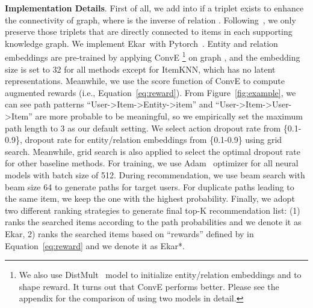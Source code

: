 \documentclass{article}
\newcommand{\name}{Ekar}
\newcommand{\xhdr}[1]{{\noindent\bfseries #1}.}
\begin{document}
\xhdr{Implementation Details} First of all, we add  into  if a triplet  exists to enhance the connectivity of graph, where  is the inverse of relation .
Following~\cite{Cao_2019}, we only preserve those triplets that are directly connected to items in each supporting knowledge graph.
We implement \name\ with Pytorch~\cite{paszke2017automatic}. 
Entity and relation embeddings are pre-trained by applying ConvE
\footnote{We also use DistMult~\cite{yang2014embedding} model to initialize entity/relation embeddings and to shape reward. It turns out that ConvE performs better. Please see the appendix for the comparison of using two models in detail.}
on graph ,
and the embedding size is set to 32 for all methods except for ItemKNN, which has no latent representations. Meanwhile, we use the score function of ConvE to compute augmented rewards (i.e., Equation~\ref{eq:reward}). 
From Figure~\ref{fig:example}, we can see path patterns ``User->Item->Entity->item'' and ``User->Item->User->Item'' are more probable to be meaningful, so we empirically set the maximum path length  to 3 as our default setting. We select action dropout rate from \{0.1-0.9\}, dropout rate for entity/relation embeddings from \{0.1-0.9\} using grid search.
Meanwhile, grid search is also applied to select the optimal dropout rate for other baseline methods.
For training, we use Adam~\cite{kingma2014adam} optimizer for all neural models with batch size of 512.  During recommendation, we use beam search with beam size 64 to generate paths for target users. For duplicate paths leading to the same item, we keep the one with the highest probability. 
Finally, we adopt two different ranking strategies to generate final top-K recommendation list: (1) ranks the searched items according to the path probabilities and we denote it as \name, 2) ranks the searched items based on ``rewards'' defined by  in Equation~\ref{eq:reward} and we denote it as \name*.
\end{document}
